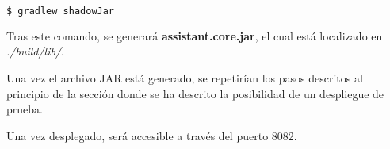     \begin{lstlisting}[language=bash]
        $ gradlew shadowJar
    \end{lstlisting}
    
    Tras este comando, se generará \textbf{assistant.core.jar}, el cual está localizado en \textit{./build/lib/}.
    
    Una vez el archivo JAR está generado, se repetirían los pasos descritos al principio de la sección donde se ha descrito la posibilidad de un despliegue de prueba.
    
    Una vez desplegado, será accesible a través del puerto 8082.
    